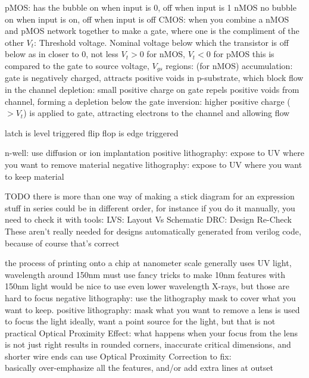 \documentclass[12pt]{article}
\begin{document}
\begin{spacing}{0.8}
\begin{multicols*}{2}
\begin{flushleft}
\begin{outline}[longenum]
  \1 pMOS:
    \2 has the bubble
    \2 on when input is 0, off when input is 1
  \1 nMOS
    \2 no bubble
    \2 on when input is on, off when input is off
  \1 CMOS: when you combine a nMOS and pMOS network together to make a gate, where one is the compliment of the other
  \1 $V_t$: Threshold voltage. Nominal voltage below which the transistor is off
    \2 below as in closer to 0, not less
    \2 $V_t>0$ for nMOS, $V_t<0$ for pMOS
    \2 this is compared to the gate to source voltage, $V_{gs}$
  \1 regions: (for nMOS)
    \2 accumulation: gate is negatively charged, attracts positive voids in p-substrate, which block flow in the channel
    \2 depletion: small positive charge on gate repels positive voids from channel, forming a depletion below the gate
    \2 inversion: higher positive charge ($>V_t$) is applied to gate, attracting electrons to the channel and allowing flow

  \1 latch is level triggered
  \1 flip flop is edge triggered

  \1 n-well: use diffusion or ion implantation
  \1 positive lithography: expose to UV where you want to remove material
  \1 negative lithography: expose to UV where you want to keep material



  \1 TODO
  \1 there is more than one way of making a stick diagram for an expression
    \2 stuff in series could be in different order, for instance
  \1 if you do it manually, you need to check it with tools:
    \2 LVS: Layout Vs Schematic
    \2 DRC: Design Re-Check
    \2 These aren't really needed for designs automatically generated from verilog code, because of course that's correct

  \1 the process of printing onto a chip at nanometer scale
  \1 generally uses UV light, wavelength around 150nm
    \2 must use fancy tricks to make 10nm features with 150nm light
    \2 would be nice to use even lower wavelength X-rays, but those are hard to focus
  \1 negative lithography: use the lithography mask to cover what you want to keep.
  \1 positive lithography: mask what you want to remove
  \1 a lens is used to focus the light
    \2 ideally, want a point source for the light, but that is not practical
    \2 Optical Proximity Effect: what happens when your focus from the lens is not just right
    \2 results in rounded corners, inaccurate critical dimensions, and shorter wire ends
    \2 can use Optical Proximity Correction to fix:
    \\ basically over-emphasize all the features, and/or add extra lines at outset


\end{outline}
\end{flushleft}
\end{multicols*}
\end{spacing}
\end{document}
